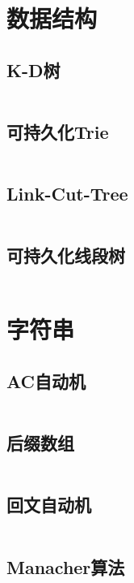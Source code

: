 \documentclass[a4paper]{article}
\newcommand{\cppcode}[1]{
    \inputminted[mathescape]{cpp}{source/#1}
}
\begin{document}
\section{数据结构}
	\subsection{K-D树}
		\cppcode{data_structure/KDTree.cpp}

	\subsection{可持久化Trie}
		\cppcode{data_structure/persistant-trie.cpp}	

	\subsection{Link-Cut-Tree}
		\cppcode{data_structure/LCT.cpp}

	\subsection{可持久化线段树}
		\cppcode{data_structure/persistant-segtree.cpp}

\section{字符串}
	\subsection{AC自动机}
		\cppcode{strings/ACautomaton.cpp}

	\subsection{后缀数组}
		\cppcode{strings/suffixarray.cpp}

	\subsection{回文自动机}
		\cppcode{strings/PAM.cpp}
	
	\subsection{Manacher算法}
		\cppcode{strings/manacher.cpp}
\end{document}
